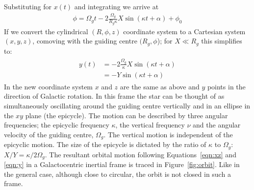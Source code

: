 Substituting for $x(t)$ and integrating we arrive at
\begin{align}
\phi = \Omega_{g} t -2\frac{\Omega_{g}}{R_{g}\kappa}X\sin(\kappa t + \alpha) + \phi_{0}
\end{align}
If we convert the cylindrical $(R,\phi,z)$ coordinate system to a Cartesian system $(x,y,z)$, comoving with the guiding centre $(R_{g},\phi$); for $X \ll R_{g}$ this simplifies to:
\begin{align}
\begin{split}\label{eqn:y}
y(t) &= -2\frac{\Omega_{g}}{\kappa} X\sin(\kappa t + \alpha) \\
&= -Y\sin(\kappa t + \alpha)
\end{split}
\end{align}
In the new coordinate system $x$ and $z$ are the same as above and $y$ points in the direction of Galactic rotation. In this frame the star can  be thought of as simultaneously oscillating around the guiding centre vertically and in an ellipse in the $xy$ plane (the epicycle). The motion can be described by three angular frequencies; the epicyclic frequency $\kappa$, the vertical frequency $\nu$ and the angular velocity of the guiding centre, $\Omega_{g}$.  The vertical motion is independent of the epicyclic motion. The size of the epicycle is dictated by the ratio of $\kappa$ to $\Omega_{g}$: $X/Y = \kappa/2\Omega_{g}$.  The resultant orbital motion following Equations~\ref{eqn:xz} and \ref{eqn:y} in a Galactocentric inertial frame is traced in Figure~\ref{fig:orbit}. Like in the general case, although close to circular, the orbit is not closed in such a frame.

